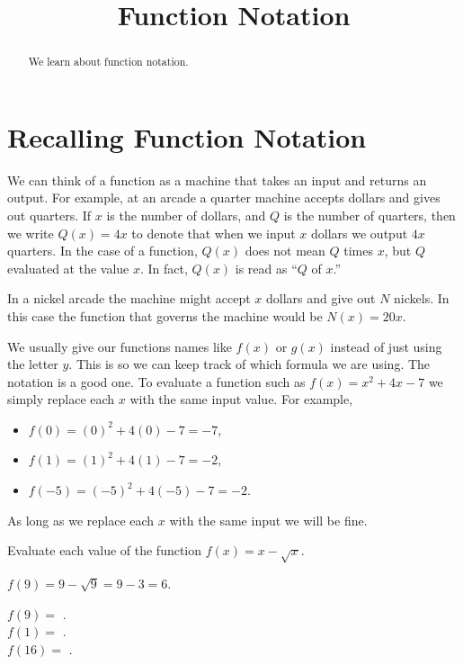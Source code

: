\documentclass{ximera}
\title{Function Notation}
\begin{document}
\begin{abstract}
We learn about function notation.
\end{abstract}
\maketitle

\section*{Recalling Function Notation}
We can think of a function as a machine that takes an input and returns an output. For example, at an arcade a quarter machine accepts dollars and gives out quarters. If $x$ is the number of dollars, and $Q$ is the number of quarters, then we write $Q(x)=4x$ to denote that when we input $x$ dollars we output $4x$ quarters. In the case of a function, $Q(x)$ does not mean $Q$ times $x$, but $Q$ evaluated at the value $x$. In fact, $Q(x)$ is read as ``$Q$ of $x$.''

In a nickel arcade the machine might accept $x$ dollars and give out $N$ nickels. In this case the function that governs the machine would be $N(x)=20x$. 

We usually give our functions names like $f(x)$ or $g(x)$ instead of just using the letter $y$. This is so we can keep track of which formula we are using. The notation is a good one. To evaluate a function such as $f(x)=x^2+4x-7$ we simply replace each $x$ with the same input value. For example,
\begin{itemize}
\item $f(0)=(0)^2+4(0)-7=-7$,
\item $f(1)=(1)^2+4(1)-7=-2$,
\item $f(-5)=(-5)^2+4(-5)-7=-2$.
\end{itemize}
As long as we replace each $x$ with the same input we will be fine.

\begin{question}
Evaluate each value of the function $f(x)=x-\sqrt{x}$.

\begin{hint}
$f(9)=9-\sqrt{9}=9-3=6$. 
\end{hint}
$f(9)=$ .\\
$f(1)=$ .\\
$f(16)=$ .

\end{question}
\end{document}
